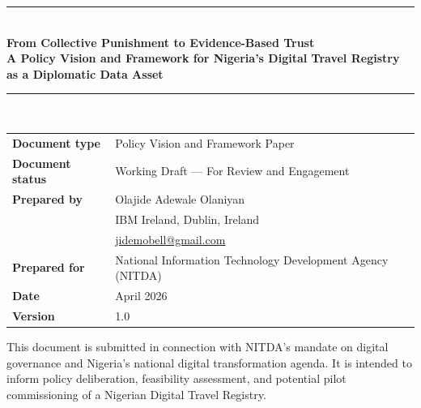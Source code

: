 \documentclass[11pt]{article}
\begin{document}
\thispagestyle{empty}

\vspace*{1.2cm}
\begin{center}
    {\color{primary-blue}\rule{\textwidth}{3pt}}\\[14pt]
    {\color{primary-blue}\LARGE\bfseries From Collective Punishment to Evidence-Based Trust}\\[10pt]
    {\color{primary-blue}\large\bfseries A Policy Vision and Framework for Nigeria's Digital Travel Registry\\
    as a Diplomatic Data Asset}\\[12pt]
    {\color{primary-blue}\rule{\textwidth}{1pt}}\\[18pt]

    \noindent
    \begin{tabularx}{\textwidth}{@{}lX@{}}
        \color{dark-grey}\small\textbf{Document type}  & \color{dark-grey}\small Policy Vision and Framework Paper \\[4pt]
        \color{dark-grey}\small\textbf{Document status} & \color{dark-grey}\small Working Draft — For Review and Engagement \\[4pt]
        \color{dark-grey}\small\textbf{Prepared by}    & \color{dark-grey}\small Olajide Adewale Olaniyan \\
                                                        & \color{dark-grey}\small IBM Ireland, Dublin, Ireland \\
                                                        & \color{dark-grey}\small \href{mailto:jidemobell@gmail.com}{jidemobell@gmail.com} \\[4pt]
        \color{dark-grey}\small\textbf{Prepared for}   & \color{dark-grey}\small National Information Technology Development Agency (NITDA) \\[4pt]
        \color{dark-grey}\small\textbf{Date}           & \color{dark-grey}\small April 2026 \\[4pt]
        \color{dark-grey}\small\textbf{Version}        & \color{dark-grey}\small 1.0 \\
    \end{tabularx}

    \vspace{1.2cm}
    \noindent\colorbox{primary-blue!7}{%
    \begin{minipage}{\dimexpr\textwidth-2\fboxsep}
    \vspace{6pt}\centering
    \small\color{dark-grey}
    This document is submitted in connection with NITDA's mandate on digital governance
    and Nigeria's national digital transformation agenda.
    It is intended to inform policy deliberation, feasibility assessment, and potential
    pilot commissioning of a Nigerian Digital Travel Registry.
    \vspace{6pt}
    \end{minipage}}
\end{center}
\clearpage
\end{document}
